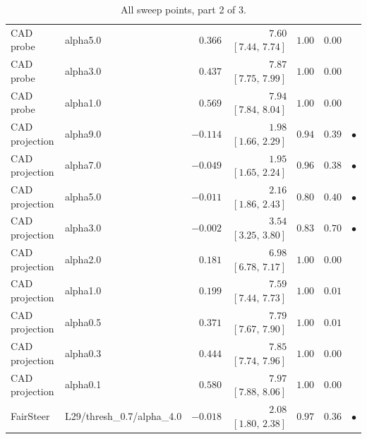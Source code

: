 \begin{table}[t]
\begin{tabular}{llrrrrc}
CAD probe & alpha5.0 & $0.366$ & $7.60$ \scriptsize$[7.44,\,7.74]$ & $1.00$ & $0.00$ &  \\
CAD probe & alpha3.0 & $0.437$ & $7.87$ \scriptsize$[7.75,\,7.99]$ & $1.00$ & $0.00$ &  \\
CAD probe & alpha1.0 & $0.569$ & $7.94$ \scriptsize$[7.84,\,8.04]$ & $1.00$ & $0.00$ &  \\
CAD projection & alpha9.0 & $-0.114$ & $1.98$ \scriptsize$[1.66,\,2.29]$ & $0.94$ & $0.39$ & $\bullet$ \\
CAD projection & alpha7.0 & $-0.049$ & $1.95$ \scriptsize$[1.65,\,2.24]$ & $0.96$ & $0.38$ & $\bullet$ \\
CAD projection & alpha5.0 & $-0.011$ & $2.16$ \scriptsize$[1.86,\,2.43]$ & $0.80$ & $0.40$ & $\bullet$ \\
CAD projection & alpha3.0 & $-0.002$ & $3.54$ \scriptsize$[3.25,\,3.80]$ & $0.83$ & $0.70$ & $\bullet$ \\
CAD projection & alpha2.0 & $0.181$ & $6.98$ \scriptsize$[6.78,\,7.17]$ & $1.00$ & $0.00$ &  \\
CAD projection & alpha1.0 & $0.199$ & $7.59$ \scriptsize$[7.44,\,7.73]$ & $1.00$ & $0.01$ &  \\
CAD projection & alpha0.5 & $0.371$ & $7.79$ \scriptsize$[7.67,\,7.90]$ & $1.00$ & $0.01$ &  \\
CAD projection & alpha0.3 & $0.444$ & $7.85$ \scriptsize$[7.74,\,7.96]$ & $1.00$ & $0.00$ &  \\
CAD projection & alpha0.1 & $0.580$ & $7.97$ \scriptsize$[7.88,\,8.06]$ & $1.00$ & $0.00$ &  \\
FairSteer & L29/thresh\_0.7/alpha\_4.0 & $-0.018$ & $2.08$ \scriptsize$[1.80,\,2.38]$ & $0.97$ & $0.36$ & $\bullet$ \\
\bottomrule
\end{tabular}
\caption{All sweep points, part 2 of 3.}
\label{tab:allsweep2}
\end{table}


